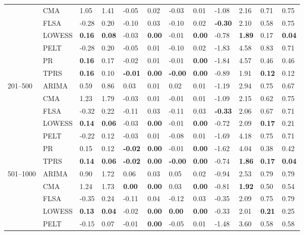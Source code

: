 \begin{table}[ht]
\begin{tabular}{llllllllllll}
   & CMA & 1.05 & 1.41 & -0.05 & 0.02 & -0.03 & 0.01 & -1.08 & 2.16 & 0.71 & 0.75 \\ 
   & FLSA & -0.28 & 0.20 & -0.10 & 0.03 & -0.10 & 0.02 & \textbf{-0.30} & 2.10 & 0.58 & 0.75 \\ 
   & LOWESS & \textbf{0.16} & \textbf{0.08} & -0.03 & \textbf{0.00} & -0.01 & \textbf{0.00} & -0.78 & \textbf{1.89} & 0.17 & \textbf{0.04} \\ 
   & PELT & -0.28 & 0.20 & -0.05 & 0.01 & -0.10 & 0.02 & -1.83 & 4.58 & 0.83 & 0.71 \\ 
   & PR & \textbf{0.16} & 0.17 & -0.02 & 0.01 & -0.01 & \textbf{0.00} & -1.84 & 4.57 & 0.46 & 0.46 \\ 
   & TPRS & \textbf{0.16} & 0.10 & \textbf{-0.01} & \textbf{0.00} & \textbf{-0.00} & \textbf{0.00} & -0.89 & 1.91 & \textbf{0.12} & 0.12 \\ 
  201–500 & ARIMA & 0.59 & 0.86 & 0.03 & 0.01 & 0.02 & 0.01 & -1.19 & 2.94 & 0.75 & 0.67 \\ 
   & CMA & 1.23 & 1.79 & -0.03 & 0.01 & -0.01 & 0.01 & -1.09 & 2.15 & 0.62 & 0.75 \\ 
   & FLSA & -0.32 & 0.22 & -0.11 & 0.03 & -0.11 & 0.03 & \textbf{-0.33} & 2.06 & 0.67 & 0.71 \\ 
   & LOWESS & \textbf{0.14} & \textbf{0.06} & -0.03 & \textbf{0.00} & -0.01 & \textbf{0.00} & -0.72 & 2.09 & \textbf{0.17} & 0.21 \\ 
   & PELT & -0.22 & 0.12 & -0.03 & 0.01 & -0.08 & 0.01 & -1.69 & 4.18 & 0.75 & 0.71 \\ 
   & PR & 0.15 & 0.12 & \textbf{-0.02} & \textbf{0.00} & -0.01 & \textbf{0.00} & -1.62 & 4.04 & 0.38 & 0.42 \\ 
   & TPRS & \textbf{0.14} & \textbf{0.06} & \textbf{-0.02} & \textbf{0.00} & \textbf{-0.00} & \textbf{0.00} & -0.74 & \textbf{1.86} & \textbf{0.17} & \textbf{0.04} \\ 
  501–1000 & ARIMA & 0.90 & 1.72 & 0.06 & 0.03 & 0.05 & 0.02 & -0.94 & 2.53 & 0.79 & 0.79 \\ 
   & CMA & 1.24 & 1.73 & \textbf{0.00} & \textbf{0.00} & 0.03 & \textbf{0.00} & -0.81 & \textbf{1.92} & 0.50 & 0.54 \\ 
   & FLSA & -0.35 & 0.24 & -0.11 & 0.04 & -0.12 & 0.03 & -0.35 & 2.09 & 0.75 & 0.79 \\ 
   & LOWESS & \textbf{0.13} & \textbf{0.04} & -0.02 & \textbf{0.00} & \textbf{0.00} & \textbf{0.00} & -0.33 & 2.01 & \textbf{0.21} & 0.25 \\ 
   & PELT & -0.15 & 0.07 & -0.01 & \textbf{0.00} & -0.05 & 0.01 & -1.48 & 3.60 & 0.58 & 0.58 \\ 

\end{tabular}
\end{table}

